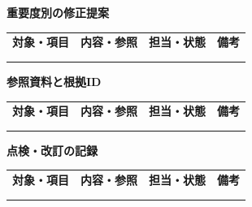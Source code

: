 \documentclass[11pt,a4paper]{article}
\begin{document}
\par{}\noindent\textbf{重要度別の修正提案}\par\vspace{1mm}
{\fontsize{8.5}{13}\selectfont
\begin{tabularx}{\linewidth}{@{}XXXX@{}}
\textbf{対象・項目} & \textbf{内容・参照} & \textbf{担当・状態} & \textbf{備考}\\[2mm]
\strut & \strut & \strut & \strut\\[5mm]
\strut & \strut & \strut & \strut\\[5mm]
\end{tabularx}
}\vspace{2mm}\par
{}
\par{}\noindent\textbf{参照資料と根拠ID}\par\vspace{1mm}
{\fontsize{8.5}{13}\selectfont
\begin{tabularx}{\linewidth}{@{}XXXX@{}}
\textbf{対象・項目} & \textbf{内容・参照} & \textbf{担当・状態} & \textbf{備考}\\[2mm]
\strut & \strut & \strut & \strut\\[5mm]
\strut & \strut & \strut & \strut\\[5mm]
\end{tabularx}
}\vspace{2mm}\par
{}
\par{}\noindent\textbf{点検・改訂の記録}\par\vspace{1mm}
{\fontsize{8.5}{13}\selectfont
\begin{tabularx}{\linewidth}{@{}XXXX@{}}
\textbf{対象・項目} & \textbf{内容・参照} & \textbf{担当・状態} & \textbf{備考}\\[2mm]
\strut & \strut & \strut & \strut\\[5mm]
\strut & \strut & \strut & \strut\\[5mm]
\end{tabularx}
}\vspace{2mm}\par
\end{document}
